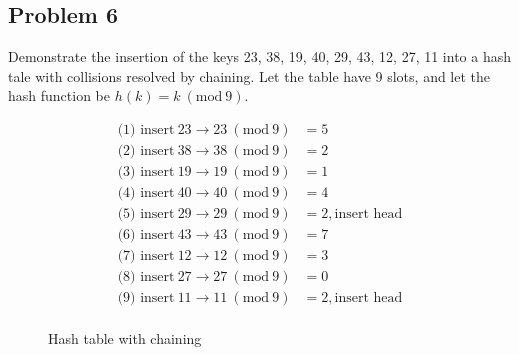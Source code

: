 \documentclass[a4paper]{article}
\makeatletter
\def\LinkedList#1{%
  \foreach \element in \list {
     \node[node of list, right = of aux, name=ele] {\element};
     \draw[link] (aux) -- (ele);
     \coordinate (aux) at (ele.east);
  }
}
\newcommand{\Mod}[1]{\ (\mathrm{mod}\ #1)}
\newenvironment{solution}
  {\begin{proof}[Solution]}
  {\end{proof}}
\renewenvironment{proof}[1][\proofname]{%
  \par\pushQED{\qed}\normalfont%
  \topsep6\p@\@plus6\p@\relax
  \trivlist\item[\hskip\labelsep\bfseries#1\@addpunct{.}]%
  \ignorespaces
}{%
  \popQED\endtrivlist\@endpefalse
}
\makeatother
\begin{document}
\subsection*{Problem 6}
Demonstrate the insertion of the keys 23, 38, 19, 40, 29, 43, 12, 27, 11 into a hash tale with collisions resolved by chaining. Let the table have 9 slots, and let the hash function be $h(k)=k \Mod{9}$.
\begin{solution}
\end{solution}
\begin{minipage}{5cm}
\begin{align*}
  \text{(1) insert}\ 23 \to 23 \Mod{9} &= 5\\
  \text{(2) insert}\ 38 \to 38 \Mod{9} &= 2\\
  \text{(3) insert}\ 19 \to 19 \Mod{9} &= 1\\
  \text{(4) insert}\ 40 \to 40 \Mod{9} &= 4\\
  \text{(5) insert}\ 29 \to 29 \Mod{9} &= 2, \text{insert head}\\
  \text{(6) insert}\ 43 \to 43 \Mod{9} &= 7\\
  \text{(7) insert}\ 12 \to 12 \Mod{9} &= 3\\
  \text{(8) insert}\ 27 \to 27 \Mod{9} &= 0\\
  \text{(9) insert}\ 11 \to 11 \Mod{9} &= 2, \text{insert head}\\
\end{align*}
\end{minipage}
\qquad
\begin{minipage}{8cm}
\begin{figure}[H]
\centering
{}
\caption{Hash table with chaining}
\end{figure}
\end{minipage}

\newpage
\end{document}
